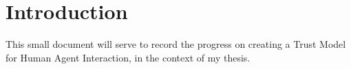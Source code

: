 \section{Introduction}
\label{sec:Introduction}
This small document will serve to record the progress on creating a Trust Model for Human Agent Interaction, in the context of my thesis. 

